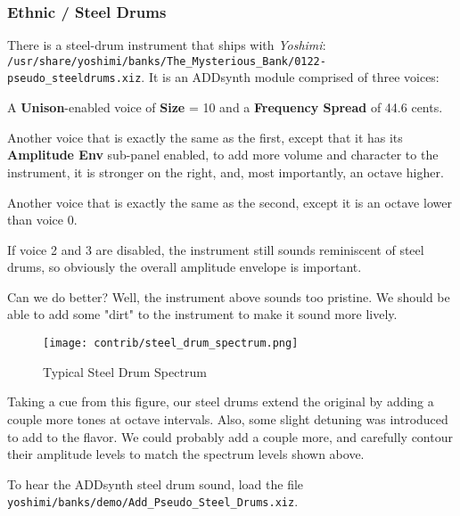 \subsubsection{Ethnic / Steel Drums}
\label{subsubsec:cookbook_instruments_ethnic_steeldrums}

   There is a steel-drum instrument that ships with \textsl{Yoshimi}:
   \texttt{/usr/share/yoshimi/banks/The\_Mysterious\_Bank/0122-pseudo\_steeldrums.xiz}.
   It is an ADDsynth module comprised of three voices:

   \begin{enumber}
      \item A \textbf{Unison}-enabled voice of \textbf{Size} = 10 and a
         \textbf{Frequency Spread} of 44.6 cents.
      \item Another voice that is exactly the same as the first, except that
         it has its \textbf{Amplitude Env} sub-panel enabled, to add more
         volume and character to the instrument, it is stronger on the
         right, and, most importantly, an octave higher.
      \item Another voice that is exactly the same as the second, 
         except it is an octave lower than voice 0.
   \end{enumber}

   If voice 2 and 3 are disabled, the instrument still sounds reminiscent of
   steel drums, so obviously the overall amplitude envelope is important.

   Can we do better?  Well, the instrument above sounds too pristine.
   We should be able to add some "dirt" to the instrument to make it sound
   more lively.

\begin{figure}[H]
   \centering 
   \texttt{[image: contrib/steel\_drum\_spectrum.png]}
   \caption{Typical Steel Drum Spectrum}
   \label{fig:cookbook_bank_steeldrum_spectrum}
\end{figure}

   Taking a cue from this figure, our steel drums extend the original
   by adding a couple more tones at octave intervals.  Also, some slight
   detuning was introduced to add to the flavor.
   We could probably add a couple more, and carefully contour their
   amplitude levels to match the spectrum levels shown above.

   To hear the ADDsynth steel drum sound, load the file
   \texttt{yoshimi/banks/demo/Add\_Pseudo\_Steel\_Drums.xiz}.

